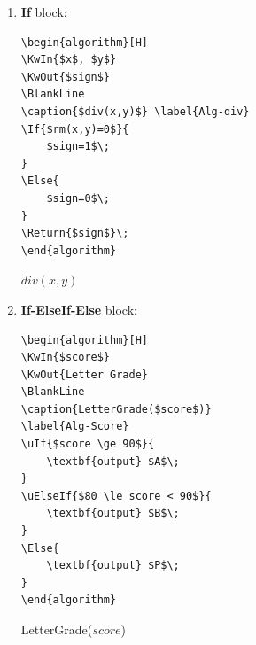\documentclass[12pt,a4paper]{article}
\theoremstyle{definition}
\begin{document}
\begin{enumerate}

\item {\color{blue}\textbf{If} block:}

\begin{minipage}[t]{0.5\textwidth}

\begin{verbatim}
\begin{algorithm}[H]
\KwIn{$x$, $y$}
\KwOut{$sign$}
\BlankLine
\caption{$div(x,y)$} \label{Alg-div}
\If{$rm(x,y)=0$}{
    $sign=1$\;
}
\Else{
    $sign=0$\;
}
\Return{$sign$}\;
\end{algorithm}
\end{verbatim}
\end{minipage}
\hspace{2mm}
\begin{minipage}[t]{0.4\textwidth}
\begin{algorithm}[H]
\BlankLine
\caption{$div(x,y)$} \label{Alg-div}
\;
\end{algorithm}
\end{minipage}

\newpage
\item {\color{blue}\textbf{If-ElseIf-Else} block:}

\begin{minipage}[t]{0.5\textwidth}
\begin{verbatim}
\begin{algorithm}[H]
\KwIn{$score$}
\KwOut{Letter Grade}
\BlankLine
\caption{LetterGrade($score$)}
\label{Alg-Score}
\uIf{$score \ge 90$}{
    \textbf{output} $A$\;
}
\uElseIf{$80 \le score < 90$}{
    \textbf{output} $B$\;
}
\Else{
    \textbf{output} $P$\;
}
\end{algorithm}
\end{verbatim}
\end{minipage}
\hspace{2mm}
\begin{minipage}[t]{0.4\textwidth}
\begin{algorithm}[H]
\BlankLine
\caption{LetterGrade($score$)} \label{Alg-Score}

\end{algorithm}
\end{minipage}



\end{enumerate}
\end{document}
